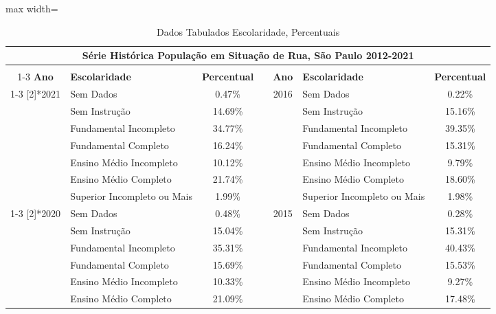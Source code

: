 \documentclass[14pt]{extarticle}
\begin{document}
\begin{table}[htbp]
  \centering
  \caption{Dados Tabulados Escolaridade, Percentuais}
  \tabcolsep=0.15cm
	\renewcommand{\arraystretch}{1.3}
	\begin{adjustbox}{max width=\linewidth}
    \begin{tabular}{clccclc}
    \toprule
    \multicolumn{7}{c}{Série Histórica População em Situação de Rua, São Paulo 2012-2021} \\
    \midrule
         &      &      &      &      &      &  \\
\cmidrule{1-3}\cmidrule{5-7}    \rowcolor[rgb]{ .906,  .902,  .902} \textbf{Ano} & \textbf{Escolaridade} & \textbf{Percentual} & \cellcolor[rgb]{ 1,  1,  1} & \textbf{Ano} & \textbf{Escolaridade} & \textbf{Percentual} \\
\cmidrule{1-3}\cmidrule{5-7}    \multirow{7}[2]{*}{2021} & Sem Dados & 0.47\% &      & \multirow{7}[2]{*}{2016} & Sem Dados & 0.22\% \\
         & Sem Instrução & 14.69\% &      &      & Sem Instrução & 15.16\% \\
         & Fundamental Incompleto & 34.77\% &      &      & Fundamental Incompleto & 39.35\% \\
         & Fundamental Completo & 16.24\% &      &      & Fundamental Completo & 15.31\% \\
         & Ensino Médio Incompleto & 10.12\% &      &      & Ensino Médio Incompleto & 9.79\% \\
         & Ensino Médio Completo & 21.74\% &      &      & Ensino Médio Completo & 18.60\% \\
         & Superior Incompleto ou Mais & 1.99\% &      &      & Superior Incompleto ou Mais & 1.98\% \\
\cmidrule{1-3}\cmidrule{5-7}    \multirow{7}[2]{*}{2020} & Sem Dados & 0.48\% &      & \multirow{7}[2]{*}{2015} & Sem Dados & 0.28\% \\
         & Sem Instrução & 15.04\% &      &      & Sem Instrução & 15.31\% \\
         & Fundamental Incompleto & 35.31\% &      &      & Fundamental Incompleto & 40.43\% \\
         & Fundamental Completo & 15.69\% &      &      & Fundamental Completo & 15.53\% \\
         & Ensino Médio Incompleto & 10.33\% &      &      & Ensino Médio Incompleto & 9.27\% \\
         & Ensino Médio Completo & 21.09\% &      &      & Ensino Médio Completo & 17.48\% \\

\end{tabular}
\end{adjustbox}
\end{table}
\end{document}
